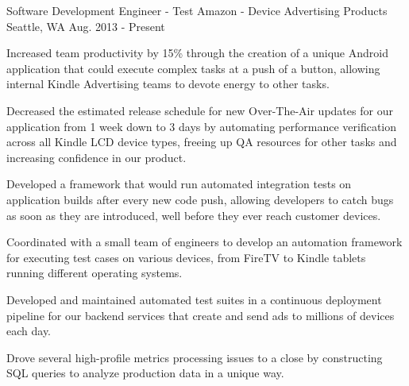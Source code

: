 

\begin{cventries}

  \cventry
    {Software Development Engineer - Test} %
    {Amazon - Device Advertising Products} %
    {Seattle, WA} %
    {Aug. 2013 - Present} %
    {
      \begin{cvitems} %
        \item {Increased team productivity by 15\% through the creation of a unique Android application that could execute complex tasks at a push of a button, allowing internal Kindle Advertising teams to devote energy to other tasks.}
        \item {Decreased the estimated release schedule for new Over-The-Air updates for our application from 1 week down to 3 days by automating performance verification across all Kindle LCD device types, freeing up QA resources for other tasks and increasing confidence in our product.}
	\item {Developed a framework that would run automated integration tests on application builds after every new code push, allowing developers to catch bugs as soon as they are introduced, well before they ever reach customer devices.}
        \item {Coordinated with a small team of engineers to develop an automation framework for executing test cases on various devices, from FireTV to Kindle tablets running different operating systems.}
        \item {Developed and maintained automated test suites in a continuous deployment pipeline for our backend services that create and send ads to millions of devices each day.}
        \item {Drove several high-profile metrics processing issues to a close by constructing SQL queries to analyze production data in a unique way.}
      \end{cvitems}
    }


\end{cventries}
